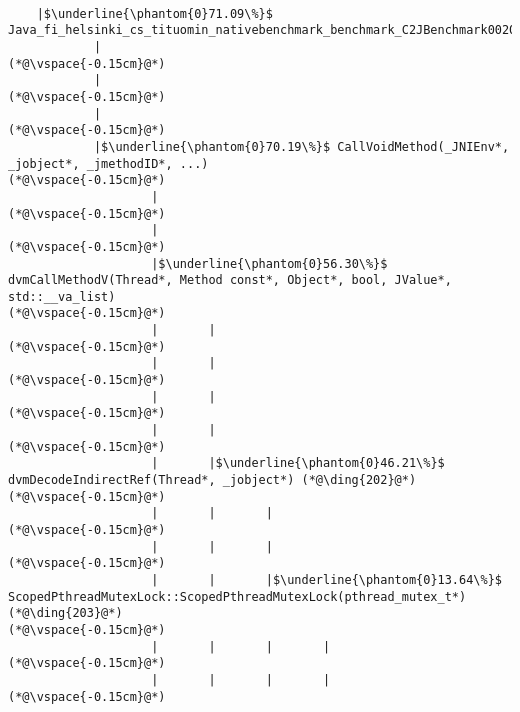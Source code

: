 \begin{lstlisting}[caption=20 viiteparametria (C$\to$Java) , label=profile:C2JBenchmark00206, numberbychapter=true, frame=lines, float, floatplacement=t]

    |$\underline{\phantom{0}71.09\%}$ Java_fi_helsinki_cs_tituomin_nativebenchmark_benchmark_C2JBenchmark00206_runInternal
            |
(*@\vspace{-0.15cm}@*)
            |
(*@\vspace{-0.15cm}@*)
            |
(*@\vspace{-0.15cm}@*)
            |$\underline{\phantom{0}70.19\%}$ CallVoidMethod(_JNIEnv*, _jobject*, _jmethodID*, ...)
(*@\vspace{-0.15cm}@*)
                    |
(*@\vspace{-0.15cm}@*)
                    |
(*@\vspace{-0.15cm}@*)
                    |$\underline{\phantom{0}56.30\%}$ dvmCallMethodV(Thread*, Method const*, Object*, bool, JValue*, std::__va_list)
(*@\vspace{-0.15cm}@*)
                    |       |
(*@\vspace{-0.15cm}@*)
                    |       |
(*@\vspace{-0.15cm}@*)
                    |       |
(*@\vspace{-0.15cm}@*)
                    |       |
(*@\vspace{-0.15cm}@*)
                    |       |$\underline{\phantom{0}46.21\%}$ dvmDecodeIndirectRef(Thread*, _jobject*) (*@\ding{202}@*)
(*@\vspace{-0.15cm}@*)
                    |       |       |
(*@\vspace{-0.15cm}@*)
                    |       |       |
(*@\vspace{-0.15cm}@*)
                    |       |       |$\underline{\phantom{0}13.64\%}$ ScopedPthreadMutexLock::ScopedPthreadMutexLock(pthread_mutex_t*) (*@\ding{203}@*)
(*@\vspace{-0.15cm}@*)
                    |       |       |       |
(*@\vspace{-0.15cm}@*)
                    |       |       |       |
(*@\vspace{-0.15cm}@*)

\end{lstlisting}
